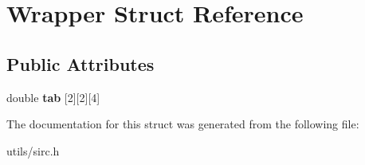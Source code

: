 \hypertarget{struct_wrapper}{}\section{Wrapper Struct Reference}
\label{struct_wrapper}
\subsection*{Public Attributes}
\begin{DoxyCompactItemize}
\item 
\mbox{\label{struct_wrapper_a1844a49f19d311b0e9f3572f92c88140}} 
double {\bfseries tab} \mbox{[}2\mbox{]}\mbox{[}2\mbox{]}\mbox{[}4\mbox{]}
\end{DoxyCompactItemize}


The documentation for this struct was generated from the following file\+:\begin{DoxyCompactItemize}
\item 
utils/sirc.\+h\end{DoxyCompactItemize}

